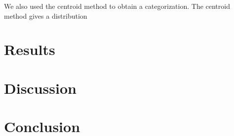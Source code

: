 \documentclass[11pt,a4paper,oldfontcommands]{memoir}
\begin{document}
\begin{flushleft}
We also used the centroid method to obtain a categorization. The centroid method gives a distribution 


\section*{Results}

\section*{Discussion}

\section*{Conclusion}
    
\end{flushleft}
\end{document}

